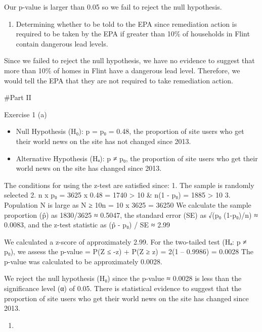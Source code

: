 \documentclass[
]{article}
\providecommand{\tightlist}{%
  \setlength{\itemsep}{0pt}\setlength{\parskip}{0pt}}
\begin{document}
Our p-value is larger than 0.05 so we fail to reject the null
hypothesis.

\begin{enumerate}
\def\labelenumi{(\alph{enumi})}
\setcounter{enumi}{5}
\tightlist
\item
  Determining whether to be told to the EPA since remediation action is
  required to be taken by the EPA if greater than 10\% of households in
  Flint contain dangerous lead levels.
\end{enumerate}

Since we failed to reject the null hypothesis, we have no evidence to
suggest that more than 10\% of homes in Flint have a dangerous lead
level. Therefore, we would tell the EPA that they are not required to
take remediation action.

\#Part II

Exercise 1 (a)

\begin{itemize}
\tightlist
\item
  Null Hypothesis (H₀): p = p₀ = 0.48, the proportion of site users who
  get their world news on the site has not changed since 2013.
\item
  Alternative Hypothesis (Hₐ): p ≠ p₀, the proportion of site users who
  get their world news on the site has changed since 2013.
\end{itemize}

The conditions for using the z-test are satisfied since: 1. The sample
is randomly selected 2. n x p₀ = 3625 x 0.48 = 1740 \textgreater{} 10 \&
n(1 - p₀) = 1885 \textgreater{} 10 3. Population N is large as N ≥ 10n =
10 x 3625 = 36250 We calculate the sample proportion (p̂) as 1830/3625 ≈
0.5047, the standard error (SE) as √(p₀ (1-p₀)/n) ≈ 0.0083, and the
z-test statistic as (p̂ - p₀) / SE ≈ 2.99

We calculated a z-score of approximately 2.99. For the two-tailed test
(Hₐ: p ≠ p₀), we assess the p-value = P(Z ≤ -\textbar z\textbar) + P(Z ≥
\textbar z\textbar) = 2(1 -- 0.9986) = 0.0028 The p-value was calculated
to be approximately 0.0028.

We reject the null hypothesis (H₀) since the p-value ≈ 0.0028 is less
than the significance level (α) of 0.05. There is statistical evidence
to suggest that the proportion of site users who get their world news on
the site has changed since 2013.

\begin{enumerate}
\def\labelenumi{(\alph{enumi})}
\setcounter{enumi}{1}
\tightlist
\item
\end{enumerate}
\end{document}
